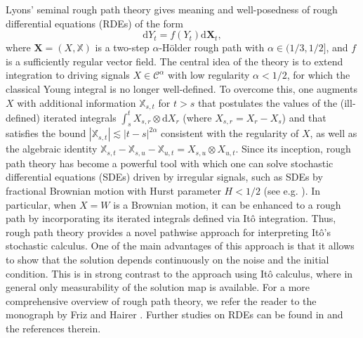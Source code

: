 \documentclass[10pt,a4paper]{article}
\numberwithin{equation}{section}
\begin{document}
Lyons' seminal rough path theory \cite{Ly98} gives meaning and well-posedness of rough differential equations (RDEs) of the form
\begin{equation}\label{troeq1}
\mathrm{d} Y_t=f(Y_t)\mathrm{d} \mathbf{X}_t,
\end{equation}
where $\mathbf X=(X, \mathbb X)$ is a two-step $\alpha$-H\"{o}lder rough path with $\alpha \in (1/3,1/2]$, and $f$ is a sufficiently regular vector field.
The central idea of the theory is to extend integration to driving signals $X \in \mathcal C^\alpha$ with low regularity $\alpha <1/2$, for which the classical Young integral is no longer well-defined.
To overcome this, one augments $X$ with additional information $\mathbb X_{s,t}$ for $t>s$ that postulates the values of the (ill-defined) iterated integrals $\int_s^t X_{s,r} \otimes \mathrm{d}X_r$ (where $X_{s,r}=X_r-X_s$) and that satisfies the bound $|\mathbb X_{s,t}| \lesssim |t-s|^{2\alpha}$ consistent with the regularity of $X$,
as well as the algebraic identity $\mathbb X_{s,t}-\mathbb X_{s,u}-\mathbb X_{u,t}=X_{s,u} \otimes X_{u,t}$.
Since its inception, rough path theory has become a powerful tool with which one can solve stochastic differential equations (SDEs) driven by irregular signals, such as SDEs by fractional Brownian motion with Hurst parameter $H<1/2$ (see e.g. \cite{CQ02}).
In particular, when $X = W$ is a Brownian motion, it can be enhanced to a rough path by incorporating its iterated integrals defined via It\^{o} integration.
Thus, rough path theory provides a novel pathwise approach for interpreting It\^{o}'s stochastic calculus.
One of the main advantages of this approach is that it allows to show that the solution depends continuously on the noise and the initial condition. This is in strong contrast to the approach using It\^{o} calculus, where in general only measurability of the solution map is available.
For a more comprehensive overview of rough path theory, we refer the reader to the monograph by Friz and Hairer \cite{FH20}. 
Further studies on RDEs can be found in \cite{CF25,DG24,FHL24,IXY24,YXP25} and the references therein.
\end{document}
